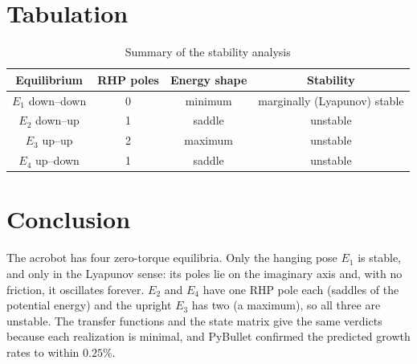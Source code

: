 \documentclass[12pt,a4paper]{article}
\newcommand{\Nm}{\,\mathrm{N\,m}}
\begin{document}
\section{Tabulation}
\begin{table}[H]
\centering
\caption{Summary of the stability analysis}
\begin{tabular}{|c|c|c|c|}
\hline
Equilibrium & RHP poles & Energy shape & Stability\\ \hline
$E_1$ down--down & 0 & minimum & marginally (Lyapunov) stable\\
$E_2$ down--up & 1 & saddle & unstable\\
$E_3$ up--up & 2 & maximum & unstable\\
$E_4$ up--down & 1 & saddle & unstable\\ \hline
\end{tabular}
\end{table}
\begin{table}[H]
\centering
\caption{Single-angle feedback at the upright $E_3$ ($|\tau|\le20\Nm$)}
\end{table}

\section{Conclusion}
The acrobot has four zero-torque equilibria. Only the hanging pose $E_1$ is stable, and only in the Lyapunov sense: its poles lie on the imaginary axis and, with no friction, it oscillates forever. $E_2$ and $E_4$ have one RHP pole each (saddles of the potential energy) and the upright $E_3$ has two (a maximum), so all three are unstable. The transfer functions and the state matrix give the same verdicts because each realization is minimal, and PyBullet confirmed the predicted growth rates to within $0.25\%$.
\end{document}
